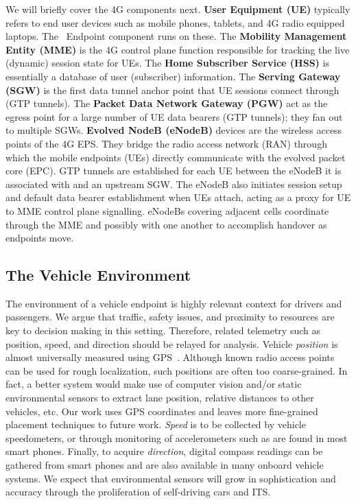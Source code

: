 We will briefly cover the 4G components next. \textbf{User Equipment
  (UE)} typically refers to end user devices such as mobile phones,
tablets, and 4G radio equipped laptops. The \name~Endpoint component
runs on these. The \textbf{Mobility Management Entity (MME)} is the 4G
control plane function responsible for tracking the live (dynamic)
session state for UEs. The \textbf{Home Subscriber Service (HSS)} is
essentially a database of user (subscriber) information. The
\textbf{Serving Gateway (SGW)} is the first data tunnel anchor point
that UE sessions connect through (GTP tunnels). The \textbf{Packet
  Data Network Gateway (PGW)} act as the egress point for a large
number of UE data bearers (GTP tunnels); they fan out to multiple
SGWs.  \textbf{Evolved NodeB (eNodeB)} devices are the wireless access
points of the 4G EPS. They bridge the radio access network (RAN)
through which the mobile endpoints (UEs) directly communicate with the
evolved packet core (EPC). GTP tunnels are established for each UE
between the eNodeB it is associated with and an upstream SGW.  The
eNodeB also initiates session setup and default data bearer
establishment when UEs attach, acting as a proxy for UE to MME
control plane signalling. eNodeBs covering adjacent cells coordinate
through the MME and possibly with one another to accomplish handover
as endpoints move.

\subsection{The Vehicle Environment}

The environment of a vehicle endpoint is highly relevant context for
drivers and passengers. We argue that traffic, safety issues, and
proximity to resources are key to decision making in this
setting. Therefore, related telemetry such as position, speed, and
direction should be relayed for analysis. Vehicle \emph{position} is
almost universally measured using GPS~\cite{misra2006global}.
Although known radio access points can be used for rough localization,
such positions are often too coarse-grained.  In fact, a better system
would make use of computer vision and/or static environmental sensors
to extract lane position, relative distances to other vehicles, etc.
Our work uses GPS coordinates and leaves more fine-grained placement
techniques to future work. \emph{Speed} is to be collected by vehicle
speedometers, or through monitoring of accelerometers such as are
found in most smart phones. Finally, to acquire \emph{direction},
digital compass readings can be gathered from smart phones and are
also available in many onboard vehicle systems.  We expect that
environmental sensors will grow in sophistication and accuracy through
the proliferation of self-driving cars and ITS.

